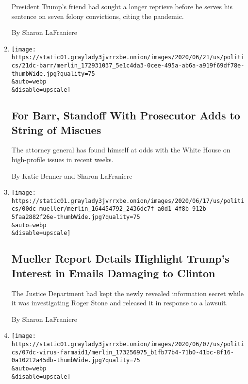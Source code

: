 \begin{enumerate}
  President Trump's friend had sought a longer reprieve before he serves
  his sentence on seven felony convictions, citing the pandemic.

  By Sharon LaFraniere
\item
  \href{/2020/06/21/us/politics/barr-berman.html}{}

  \texttt{[image: https://static01.graylady3jvrrxbe.onion/images/2020/06/21/us/politics/21dc-barr/merlin\_172931037\_5e1c4da3-0cee-495a-ab6a-a919f69df78e-thumbWide.jpg?quality=75\\\&auto=webp\\\&disable=upscale]}

  \hypertarget{for-barr-standoff-with-prosecutor-adds-to-string-of-miscues}{%
  \subsection{For Barr, Standoff With Prosecutor Adds to String of
  Miscues}\label{for-barr-standoff-with-prosecutor-adds-to-string-of-miscues}}

  The attorney general has found himself at odds with the White House on
  high-profile issues in recent weeks.

  By Katie Benner and Sharon LaFraniere
\item
  \href{/2020/06/19/us/politics/mueller-report-redactions-roger-stone.html}{}

  \texttt{[image: https://static01.graylady3jvrrxbe.onion/images/2020/06/17/us/politics/00dc-mueller/merlin\_164454792\_2436dc7f-a0d1-4f8b-912b-5faa2882f26e-thumbWide.jpg?quality=75\\\&auto=webp\\\&disable=upscale]}

  \hypertarget{mueller-report-details-highlight-trumps-interest-in-emails-damaging-to-clinton}{%
  \subsection{Mueller Report Details Highlight Trump's Interest in
  Emails Damaging to
  Clinton}\label{mueller-report-details-highlight-trumps-interest-in-emails-damaging-to-clinton}}

  The Justice Department had kept the newly revealed information secret
  while it was investigating Roger Stone and released it in response to
  a lawsuit.

  By Sharon LaFraniere
\item
  \href{/2020/06/07/us/politics/virus-trump-aid-farmers.html}{}

  \texttt{[image: https://static01.graylady3jvrrxbe.onion/images/2020/06/07/us/politics/07dc-virus-farmaid1/merlin\_173256975\_b1fb77b4-71b0-41bc-8f16-0a10212a45db-thumbWide.jpg?quality=75\\\&auto=webp\\\&disable=upscale]}


\end{enumerate}
